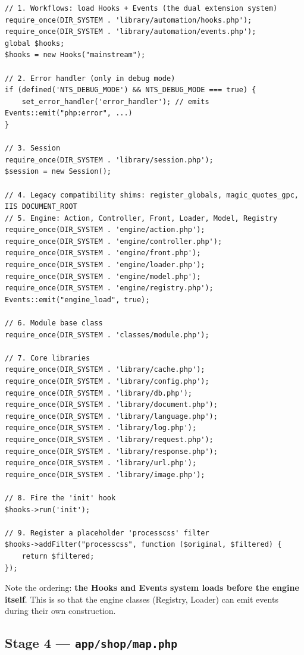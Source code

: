 \documentclass[11pt,a4paper]{article}
\begin{document}
\begin{lstlisting}[caption={\texttt{system/startup.php}, the engine bootstrap (abridged).},label={lst:startup}]
// 1. Workflows: load Hooks + Events (the dual extension system)
require_once(DIR_SYSTEM . 'library/automation/hooks.php');
require_once(DIR_SYSTEM . 'library/automation/events.php');
global $hooks;
$hooks = new Hooks("mainstream");

// 2. Error handler (only in debug mode)
if (defined('NTS_DEBUG_MODE') && NTS_DEBUG_MODE === true) {
    set_error_handler('error_handler'); // emits Events::emit("php:error", ...)
}

// 3. Session
require_once(DIR_SYSTEM . 'library/session.php');
$session = new Session();

// 4. Legacy compatibility shims: register_globals, magic_quotes_gpc, IIS DOCUMENT_ROOT
// 5. Engine: Action, Controller, Front, Loader, Model, Registry
require_once(DIR_SYSTEM . 'engine/action.php');
require_once(DIR_SYSTEM . 'engine/controller.php');
require_once(DIR_SYSTEM . 'engine/front.php');
require_once(DIR_SYSTEM . 'engine/loader.php');
require_once(DIR_SYSTEM . 'engine/model.php');
require_once(DIR_SYSTEM . 'engine/registry.php');
Events::emit("engine_load", true);

// 6. Module base class
require_once(DIR_SYSTEM . 'classes/module.php');

// 7. Core libraries
require_once(DIR_SYSTEM . 'library/cache.php');
require_once(DIR_SYSTEM . 'library/config.php');
require_once(DIR_SYSTEM . 'library/db.php');
require_once(DIR_SYSTEM . 'library/document.php');
require_once(DIR_SYSTEM . 'library/language.php');
require_once(DIR_SYSTEM . 'library/log.php');
require_once(DIR_SYSTEM . 'library/request.php');
require_once(DIR_SYSTEM . 'library/response.php');
require_once(DIR_SYSTEM . 'library/url.php');
require_once(DIR_SYSTEM . 'library/image.php');

// 8. Fire the 'init' hook
$hooks->run('init');

// 9. Register a placeholder 'processcss' filter
$hooks->addFilter("processcss", function ($original, $filtered) {
    return $filtered;
});
\end{lstlisting}

Note the ordering: \textbf{the Hooks and Events system loads before
the engine itself}. This is so that the engine classes (Registry,
Loader) can emit events during their own construction.

\subsection{Stage 4 --- \texttt{app/shop/map.php}}
\end{document}
